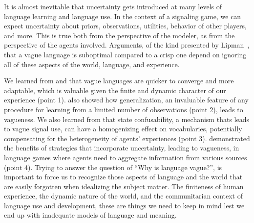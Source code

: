 \documentclass[a4paper]{article}
\begin{document}
It is almost inevitable that uncertainty gets introduced at many levels of language learning and language use.
In the context of a signaling game, we can expect uncertainty about priors, observations, utilities, behavior of other players, and more.
This is true both from the perspective of the modeler, as from the perspective of the agents involved.
Arguments, of the kind presented by Lipman~\parencite*{lipman_why_2009}, that a vague language is suboptimal compared to a crisp one depend on ignoring all of these aspects of the world, language, and experience.

We learned from \citeauthor{oconnor_evolution_2014} and \citeauthor{franke_vagueness_2017} that vague languages are quicker to converge and more adaptable, which is valuable given the finite and dynamic character of our experience (point 1).
\citeauthor{oconnor_evolving_2015} also showed how generalization, an invaluable feature of any procedure for learning from a limited number of observations (point 2), leads to vagueness.
We also learned from \citeauthor{franke_vagueness_2017} that state confusability, a mechanism thats leads to vague signal use, can have a homogenizing effect on vocabularies, potentially compensating for the heterogeneity of agents' experiences (point 3).
\citeauthor{lawry_vagueness_2017} demonstrated the benefits of strategies that incorporate uncertainty, leading to vagueness, in language games where agents need to aggregate information from various sources (point 4).
Trying to answer the question of ``Why is language vague?'', is important to force us to recognize those aspects of language and the world that are easily forgotten when idealizing the subject matter.
The finiteness of human experience, the dynamic nature of the world, and the communitarian context of language use and development, these are things we need to keep in mind lest we end up with inadequate models of language and meaning.
\end{document}
